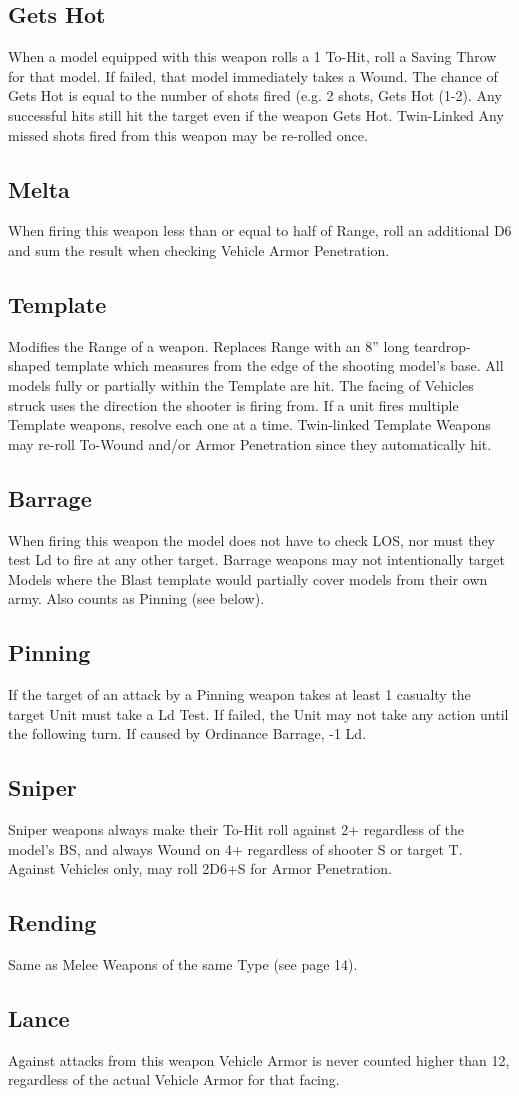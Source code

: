 \subsection{Gets Hot}
When a model equipped with this weapon rolls a 1 To-Hit, roll
a Saving Throw for that model. If failed, that model
immediately takes a Wound. The chance of Gets Hot is equal
to the number of shots fired (e.g. 2 shots, Gets Hot (1-2). Any
successful hits still hit the target even if the weapon Gets Hot.
Twin-Linked
Any missed shots fired from this weapon may be re-rolled
once.


\subsection{Melta}
When firing this weapon less than or equal to half of Range,
roll an additional D6 and sum the result when checking Vehicle
Armor Penetration.


\subsection{Template}
Modifies the Range of a weapon. Replaces Range with an 8”
long teardrop-shaped template which measures from the edge
of the shooting model’s base. All models fully or partially within
the Template are hit. The facing of Vehicles struck uses the
direction the shooter is firing from. If a unit fires multiple
Template weapons, resolve each one at a time. Twin-linked
Template Weapons may re-roll To-Wound and/or Armor
Penetration since they automatically hit.


\subsection{Barrage}
When firing this weapon the model does not have to check
LOS, nor must they test Ld to fire at any other target. Barrage
weapons may not intentionally target Models where the Blast
template would partially cover models from their own army.
Also counts as Pinning (see below).


\subsection{Pinning}
If the target of an attack by a Pinning weapon takes at least 1
casualty the target Unit must take a Ld Test. If failed, the Unit
may not take any action until the following turn. If caused by
Ordinance Barrage, -1 Ld.


\subsection{Sniper}
Sniper weapons always make their To-Hit roll against 2+
regardless of the model’s BS, and always Wound on 4+
regardless of shooter S or target T. Against Vehicles only, may
roll 2D6+S for Armor Penetration.


\subsection{Rending}
Same as Melee Weapons of the same Type (see page 14).


\subsection{Lance}
Against attacks from this weapon Vehicle Armor is never
counted higher than 12, regardless of the actual Vehicle Armor
for that facing.

